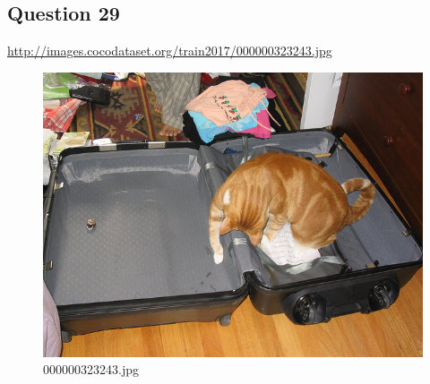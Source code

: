 \subsection*{Question 29}
\url{http://images.cocodataset.org/train2017/000000323243.jpg}
    \begin{figure}[h]
        \centering
        \includegraphics[width=0.8\linewidth]{../image set/easy/000000323243.jpg}
        \caption{000000323243.jpg}
    \end{figure}
